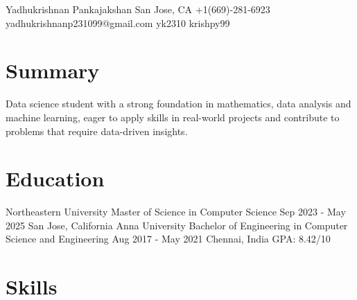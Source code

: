\documentclass[letterpaper]{resume_config}
\begin{document}
\Header
    {Yadhukrishnan Pankajakshan} %
    {San Jose, CA} %
    {+1(669)-281-6923} %
    {yadhukrishnanp231099@gmail.com} %
    {yk2310} %
    {krishpy99} %

\section{Summary}
{
    Data science student with a strong foundation in mathematics, data analysis and machine learning, eager to apply skills in real-world projects and contribute to problems that require data-driven insights.
}


\section{Education}

\EducationExperience
    {Northeastern University} %
    {Master of Science in Computer Science} %
    {Sep 2023 - May 2025} %
    {San Jose, California} %
    {}
\EducationExperience
    {Anna University} %
    {Bachelor of Engineering in Computer Science and Engineering} %
    {Aug 2017 - May 2021} %
    {Chennai, India} %
    {GPA: 8.42/10}
\vspace{-5pt}

\section{Skills}
\end{document}
